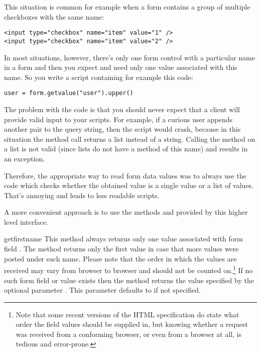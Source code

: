 This situation is common for example when a form contains a group of
multiple checkboxes with the same name:

\begin{verbatim}
<input type="checkbox" name="item" value="1" />
<input type="checkbox" name="item" value="2" />
\end{verbatim}

In most situations, however, there's only one form control with a
particular name in a form and then you expect and need only one value
associated with this name.  So you write a script containing for
example this code:

\begin{verbatim}
user = form.getvalue("user").upper()
\end{verbatim}

The problem with the code is that you should never expect that a
client will provide valid input to your scripts.  For example, if a
curious user appends another  pair to the query string,
then the script would crash, because in this situation the
 method call returns a list instead of a
string.  Calling the  method on a list is not valid
(since lists do not have a method of this name) and results in an
 exception.

Therefore, the appropriate way to read form data values was to always
use the code which checks whether the obtained value is a single value
or a list of values.  That's annoying and leads to less readable
scripts.

A more convenient approach is to use the methods 
and  provided by this higher level interface.

\begin{methoddesc}[FieldStorage]{getfirst}{name}
  This method always returns only one value associated with form field
  .  The method returns only the first value in case that
  more values were posted under such name.  Please note that the order
  in which the values are received may vary from browser to browser
  and should not be counted on.\footnote{Note that some recent
      versions of the HTML specification do state what order the
      field values should be supplied in, but knowing whether a
      request was received from a conforming browser, or even from a
      browser at all, is tedious and error-prone.}  If no such form
  field or value exists then the method returns the value specified by
  the optional parameter .  This parameter defaults to
   if not specified.
\end{methoddesc}

